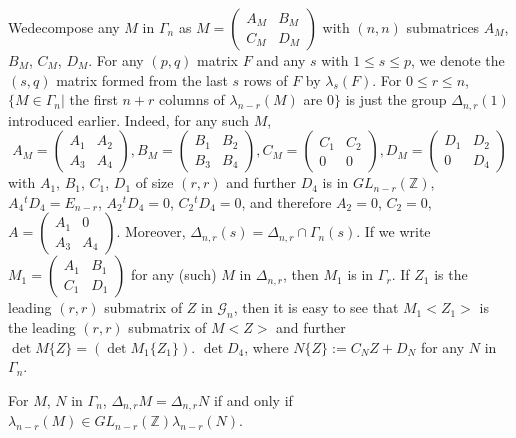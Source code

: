 We\pageoriginale decompose any $M$ in $\Gamma_{n}$ as
$M=\left(\begin{smallmatrix} A_{M} & B_{M}\\ C_{M} & D_{M}
\end{smallmatrix}\right)$ with $(n,n)$ submatrices $A_{M}$, $B_{M}$,
$C_{M}$, $D_{M}$. For any $(p,q)$ matrix $F$ and any $s$ with $1\leq
s\leq p$, we denote the $(s,q)$ matrix formed from the last $s$ rows
of $F$ by $\lambda_{s}(F)$. For $0\leq r\leq n$, $\{M\in\Gamma_{n}|$
the first $n+r$ columns of $\lambda_{n-r}(M)$ are $0\}$ is just the
group $\Delta_{n,r}(1)$ introduced earlier. Indeed, for any such $M$, 
$$
A_{M}=
\begin{pmatrix}
A_{1} & A_{2}\\
A_{3} & A_{4}
\end{pmatrix},
B_{M}=
\begin{pmatrix}
B_{1} & B_{2}\\
B_{3} & B_{4}
\end{pmatrix},
C_{M}=
\begin{pmatrix}
C_{1} & C_{2}\\
0 & 0
\end{pmatrix},
D_{M}=
\begin{pmatrix}
D_{1} & D_{2}\\
0 & D_{4}
\end{pmatrix}
$$
with $A_{1}$, $B_{1}$, $C_{1}$, $D_{1}$ of size $(r,r)$ and further
$D_{4}$ is in $GL_{n-r}(\mathbb{Z})$, $A_{4}{}^{t}D_{4}=E_{n-r}$,
$A_{2}{}^{t}D_{4}=0$, $C_{2}{}^{t}D_{4}=0$, and therefore $A_{2}=0$,
$C_{2}=0$, $A=\left(\begin{smallmatrix} A_{1} & 0\\ A_{3} & A_{4}
\end{smallmatrix}\right)$. Moreover, $\Delta_{n,r}(s)=\Delta_{n,r}\cap
\Gamma_{n}(s)$. If we write $M_{1}=\left(\begin{smallmatrix} A_{1} &
  B_{1}\\ C_{1} & D_{1}\end{smallmatrix}\right)$ for any (such) $M$ in
$\Delta_{n,r}$, then $M_{1}$ is in $\Gamma_{r}$. If $Z_{1}$ is the
leading $(r,r)$ submatrix of $Z$ in $\mathscr{G}_{n}$, then it is easy
to see that $M_{1}<Z_{1}>$ is the leading $(r,r)$ submatrix of $M<Z>$
and further $\det M\{Z\}=(\det M_{1}\{Z_{1}\})$. $\det D_{4}$, where
$N\{Z\}:=C_{N}Z+D_{N}$ for any $N$ in $\Gamma_{n}$.

\setcounter{sublemma}{9}
\begin{sublemma}\label{c1:lem-1.6.10}
For $M$, $N$ in $\Gamma_{n}$, $\Delta_{n,r}M=\Delta_{n,r}N$ if and
only if $\lambda_{n-r}(M)\in GL_{n-r}(\mathbb{Z})\lambda_{n-r}(N)$. 
\end{sublemma}

